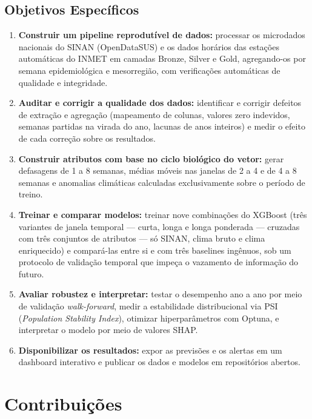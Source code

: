 \subsection{Objetivos Específicos}

\begin{enumerate}
    \item \textbf{Construir um pipeline reprodutível de dados:} processar os microdados nacionais do SINAN (OpenDataSUS) e os dados horários das estações automáticas do INMET em camadas Bronze, Silver e Gold, agregando-os por semana epidemiológica e mesorregião, com verificações automáticas de qualidade e integridade.

    \item \textbf{Auditar e corrigir a qualidade dos dados:} identificar e corrigir defeitos de extração e agregação (mapeamento de colunas, valores zero indevidos, semanas partidas na virada do ano, lacunas de anos inteiros) e medir o efeito de cada correção sobre os resultados.

    \item \textbf{Construir atributos com base no ciclo biológico do vetor:} gerar defasagens de 1 a 8 semanas, médias móveis nas janelas de 2 a 4 e de 4 a 8 semanas e anomalias climáticas calculadas exclusivamente sobre o período de treino.

    \item \textbf{Treinar e comparar modelos:} treinar nove combinações do XGBoost (três variantes de janela temporal --- curta, longa e longa ponderada --- cruzadas com três conjuntos de atributos --- só SINAN, clima bruto e clima enriquecido) e compará-las entre si e com três baselines ingênuos, sob um protocolo de validação temporal que impeça o vazamento de informação do futuro.

    \item \textbf{Avaliar robustez e interpretar:} testar o desempenho ano a ano por meio de validação \textit{walk-forward}, medir a estabilidade distribucional via PSI (\textit{Population Stability Index}), otimizar hiperparâmetros com Optuna, e interpretar o modelo por meio de valores SHAP.

    \item \textbf{Disponibilizar os resultados:} expor as previsões e os alertas em um dashboard interativo e publicar os dados e modelos em repositórios abertos.
\end{enumerate}

\section{Contribuições}

